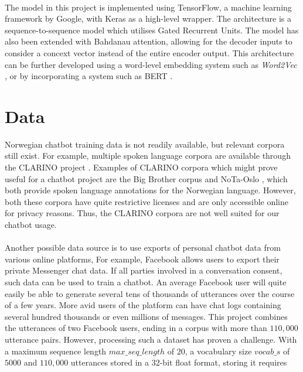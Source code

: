 \documentclass{article}
\begin{document}
\paragraph{}
The model in this project is implemented using TensorFlow, a machine learning
framework by Google, with Keras as a high-level wrapper. The architecture is 
a sequence-to-sequence model which utilises Gated Recurrent Units. The model
has also been extended with Bahdanau attention, allowing for the decoder inputs
to consider a concext vector instead of the entire encoder output. This
architecture can be further developed using a word-level embedding system such
as \textit{Word2Vec} \cite{word2vec}, or by incorporating a system such as
BERT \cite{bert2018}.

\section*{Data}
Norwegian chatbot training data is not readily available, but relevant corpora
still exist.  For example, multiple spoken language corpora are available
through the CLARINO project \cite{clarino-about}. Examples of CLARINO
corpora which might prove useful for a chatbot project are the Big Brother
corpus \cite{clarino-bb} and NoTa-Oslo \cite{clarino-nota}, which both provide
spoken language annotations for the Norwegian language. However, both these
corpora have quite restrictive licenses and are only accessible online for
privacy reasons. Thus, the CLARINO corpora are not well suited for our chatbot
usage.

\paragraph{}
Another possible data source is to use exports of personal chatbot data from
various online platforms, For example, Facebook allows users to export their
private Messenger chat data. If all parties involved in a conversation consent,
such data can be used to train a chatbot. An average Facebook user will quite
easily be able to generate several tens of thousands of utterances over the
course of a few years. More avid users of the platform can have chat logs
containing several hundred thousands or even millions of messages. This project
combines the utterances of two Facebook users, ending in a corpus with more
than $110, 000$ utterance pairs. However, processing such a dataset has proven a
challenge. With a maximum sequence length $max\_seq\_length$ of $20$, a
vocabulary size $vocab\_s$ of $5000$ and $110, 000$ utterances stored in a
32-bit float format, storing it requires
\end{document}
